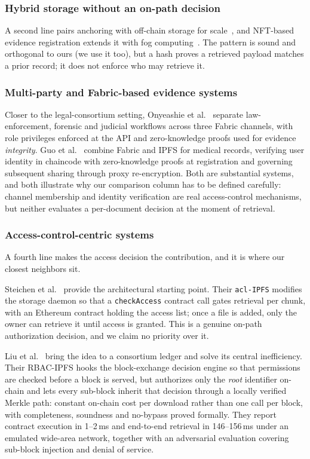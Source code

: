 \documentclass[preprint,12pt]{elsarticle}
\begin{document}
\subsubsection{Hybrid storage without an on-path decision}
A second line pairs anchoring with off-chain storage for
scale~\cite{liu2024blockchain,jlil2024blockchain}, and NFT-based evidence
registration extends it with fog computing~\cite{peelam2026decentralized}. The
pattern is sound and orthogonal to ours (we use it too), but a hash proves
a retrieved payload matches a prior record; it does not enforce who may
retrieve it.

\subsubsection{Multi-party and Fabric-based evidence systems}
Closer to the legal-consortium setting, Onyeashie et
al.~\cite{onyeashie2025fabricEvidence} separate law-enforcement, forensic and
judicial workflows across three Fabric channels, with role privileges enforced
at the API and zero-knowledge proofs used for evidence \emph{integrity}. Guo et
al.~\cite{guo2024efficient} combine Fabric and IPFS for medical records,
verifying user identity in chaincode with zero-knowledge proofs at registration
and governing subsequent sharing through proxy re-encryption. Both are
substantial systems, and both illustrate why our comparison column has to be
defined carefully: channel membership and identity verification are real
access-control mechanisms, but neither evaluates a per-document decision at the
moment of retrieval.

\subsubsection{Access-control-centric systems}
\label{sec:acl_systems}
A fourth line makes the access decision the contribution, and it is where our
closest neighbors sit.

Steichen et al.~\cite{steichen2018blockchain} provide the architectural
starting point. Their \texttt{acl-IPFS} modifies the storage daemon so that a
\texttt{checkAccess} contract call gates retrieval per chunk, with an Ethereum
contract holding the access list; once a file is added, only the owner can
retrieve it until access is granted. This is a genuine on-path authorization
decision, and we claim no priority over it.

Liu et al.~\cite{liu2026rbacipfs} bring the idea to a consortium ledger and
solve its central inefficiency. Their RBAC-IPFS hooks the block-exchange
decision engine so that permissions are checked before a block is served, but
authorizes only the \emph{root} identifier on-chain and lets every sub-block
inherit that decision through a locally verified Merkle path: constant on-chain cost per download rather than one call per block, with completeness,
soundness and no-bypass proved formally. They report contract execution in
1--2\,ms and end-to-end retrieval in 146--156\,ms under an emulated wide-area
network, together with an adversarial evaluation covering sub-block injection
and denial of service.
\end{document}

